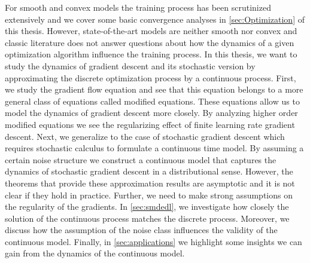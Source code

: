 \documentclass[12pt]{article}
\theoremstyle{definition}
\numberwithin{equation}{section}
\begin{document}
For smooth and convex models the training process has been scrutinized extensively and we cover some basic convergence analyses in \autoref{sec:Optimization} of this thesis. However, state-of-the-art models are neither smooth nor convex and classic literature does not answer questions about how the dynamics of a given optimization algorithm influence the training process. In this thesis, we want to study the dynamics of gradient descent and its stochastic version by approximating the discrete optimization process by a continuous process. First, we study the gradient flow equation and see that this equation belongs to a more general class of equations called modified equations. These equations allow us to model the dynamics of gradient descent more closely. By analyzing higher order modified equations we see the regularizing effect of finite learning rate gradient descent. Next, we generalize to the case of stochastic gradient descent which requires stochastic calculus to formulate a continuous time model. By assuming a certain noise structure we construct a continuous model that captures the dynamics of stochastic gradient descent in a distributional sense.
However, the theorems that provide these approximation results are asymptotic and it is not clear if they hold in practice. Further, we need to make strong assumptions on the regularity of the gradients. In \autoref{sec:smdedl}, we investigate how closely the solution of the continuous process matches the discrete process. Moreover, we discuss how the assumption of the noise class influences the validity of the continuous model.
Finally, in \autoref{sec:applications} we highlight some insights we can gain from the dynamics of the continuous model.
\end{document}
